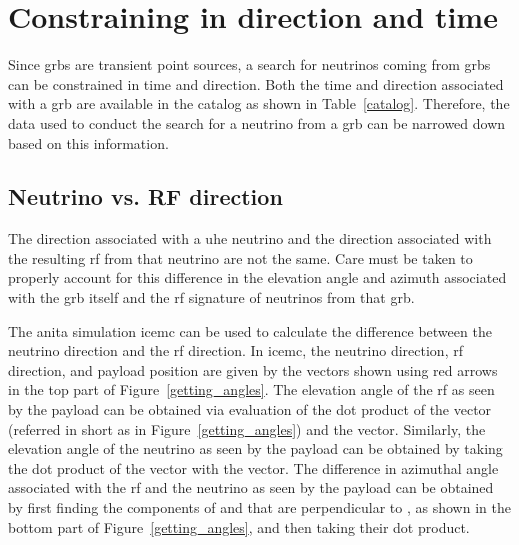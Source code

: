 \section{Constraining in direction and time}

Since \gls{grbs} are transient point sources, a search for neutrinos coming from \gls{grbs} can be constrained in time and direction. Both the time and direction associated with a \gls{grb} are available in the catalog as shown in Table~\ref{catalog}. Therefore, the data used to conduct the search for a neutrino from a \gls{grb} can be narrowed down based on this information. 


\subsection{Neutrino vs. RF direction}

The direction associated with a \gls{uhe} neutrino and the direction associated with the resulting \gls{rf} from that neutrino are not the same. Care must be taken to properly account for this difference in the elevation angle and azimuth associated with the \gls{grb} itself and the \gls{rf} signature of neutrinos from that \gls{grb}. 

The \gls{anita} simulation icemc can be used to calculate the difference between the neutrino direction and the \gls{rf} direction. In icemc, the neutrino direction, \gls{rf} direction, and payload position are given by the vectors shown using red arrows in the top part of Figure~\ref{getting_angles}. The elevation angle of the \gls{rf} as seen by the payload can be obtained via evaluation of the dot product of the  vector (referred in short as  in Figure~\ref{getting_angles}) and the  vector. Similarly, the elevation angle of the neutrino as seen by the payload can be obtained by taking the dot product of the  vector with the  vector. The difference in azimuthal angle associated with the \gls{rf} and the neutrino as seen by the payload can be obtained by first finding the components of  and  that are perpendicular to , as shown in the bottom part of Figure~\ref{getting_angles}, and then taking their dot product. 

